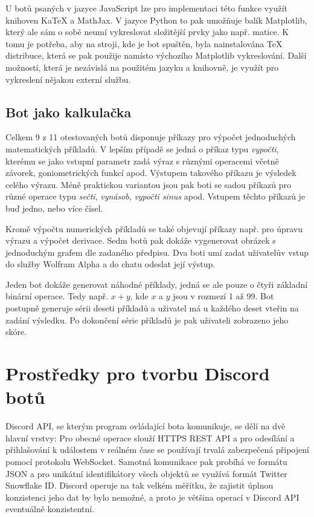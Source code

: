 \documentclass[FM]{tulthesis}
\begin{document}
	U botů psaných v jazyce JavaScript lze pro implementaci této funkce využít knihoven KaTeX a MathJax. V jazyce Python to pak umožňuje balík Matplotlib, který ale sám o sobě neumí vykreslovat složitější prvky jako např. matice. K tomu je potřeba, aby na stroji, kde je bot spuštěn, byla nainstalována TeX distribuce, která se pak použije namísto výchozího Matplotlib vykreslování. Další možností, která je nezávislá na použitém jazyku a knihovně, je využít pro vykreslení nějakou externí službu.
	
	\section{Bot jako kalkulačka}
	
	Celkem 9 z 11 otestovaných botů disponuje příkazy pro výpočet jednoduchých matematických příkladů. V lepším případě se jedná o příkaz typu \textit{vypočti}, kterému se jako vstupní parametr zadá výraz s různými operacemi včetně závorek, goniometrických funkcí apod. Výstupem takového příkazu je výsledek celého výrazu. Méně praktickou variantou jsou pak boti se sadou příkazů pro různé operace typu \textit{sečti}, \textit{vynásob}, \textit{vypočti sinus} apod. Vstupem těchto příkazů je buď jedno, nebo více čísel.
	
	Kromě výpočtu numerických příkladů se také objevují příkazy např. pro úpravu výrazu a výpočet derivace. Sedm botů pak dokáže vygenerovat obrázek s jednoduchým grafem dle zadaného předpisu. Dva boti umí zadat uživatelův vstup do služby Wolfram Alpha a do chatu odeslat její výstup.
	
	Jeden bot dokáže generovat náhodné příklady, jedná se ale pouze o čtyři základní binární operace. Tedy např. $x+y$, kde $x$ a $y$ jsou v rozmezí 1 až 99. Bot postupně generuje sérii deseti příkladů a uživatel má u každého deset vteřin na zadání výsledku. Po dokončení série příkladů je pak uživateli zobrazeno jeho skóre.
		
	\chapter{Prostředky pro tvorbu Discord botů}\label{Chapter4}
		
	Discord API, se kterým program ovládající bota komunikuje, se dělí na dvě hlavní vrstvy: Pro obecné operace slouží HTTPS REST API a pro odesílání a přihlašování k událostem v reálném čase se používají trvalá zabezpečená připojení pomocí protokolu WebSocket. Samotná komunikace pak probíhá ve formátu JSON a pro unikátní identifikátory všech objektů se využívá formát Twitter Snowflake ID. \mbox{Discord} operuje na tak velkém měřítku, že zajistit úplnou konzistenci jeho dat by bylo nemožné, a proto je většina operací v Discord API eventuálně konzistentní. \cite{doc_Discord}
	
\end{document}
